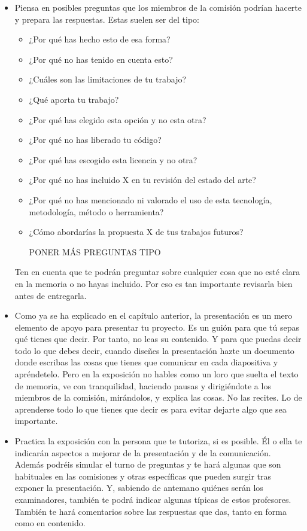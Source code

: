 \begin{itemize}
    \item Piensa en posibles preguntas que los miembros de la comisión podrían hacerte y prepara las respuestas. Estas suelen ser del tipo:

    \begin{itemize}
        \item ¿Por qué has hecho esto de esa forma?
        \item ¿Por qué no has tenido en cuenta esto?
        \item ¿Cuáles son las limitaciones de tu trabajo?
        \item ¿Qué aporta tu trabajo?
        \item ¿Por qué has elegido esta opción y no esta otra?
        \item ¿Por qué no has liberado tu código? 
        \item ¿Por qué has escogido esta licencia y no otra?
        \item ¿Por qué no has incluido X en tu revisión del estado del arte?
        \item ¿Por qué no has mencionado ni valorado el uso de esta tecnología, metodología, método o herramienta?
        \item ¿Cómo abordarías la propuesta X de tus trabajos futuros? 
        \item [PONER MÁS PREGUNTAS TIPO]
    \end{itemize}

    Ten en cuenta que te podrán preguntar sobre cualquier cosa que no esté clara en la memoria o no hayas incluido. Por eso es tan importante revisarla bien antes de entregarla. 

    \item Como ya se ha explicado en el capítulo anterior, la presentación es un mero elemento de apoyo para presentar tu proyecto. Es un guión para que tú sepas qué tienes que decir. Por tanto, no leas su contenido. Y para que puedas decir todo lo que debes decir, cuando diseñes la presentación hazte un documento donde escribas las cosas que tienes que comunicar en cada diapositiva y apréndetelo. Pero en la exposición no hables como un loro que suelta el texto de memoria, ve con tranquilidad, haciendo pausas y dirigiéndote a los miembros de la comisión, mirándolos, y explica las cosas. No las recites. Lo de aprenderse todo lo que tienes que decir es para evitar dejarte algo que sea importante. 

    \item Practica la exposición con la persona que te tutoriza, si es posible. Él o ella te indicarán aspectos a mejorar de la presentación y de la comunicación. Además podréis simular el turno de preguntas y te hará algunas que son habituales en las comisiones y otras específicas que pueden surgir tras exponer la presentación. Y, sabiendo de antemano quiénes serán los examinadores, también te podrá indicar algunas típicas de estos profesores. También te hará comentarios sobre las respuestas que das, tanto en forma como en contenido.


\end{itemize}
